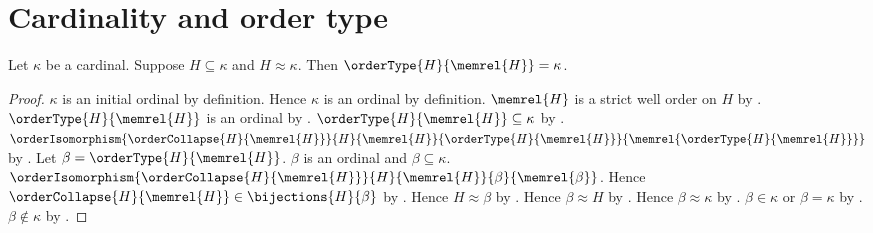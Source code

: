 \section{Cardinality and order type}











\begin{theorem}\label{full_cardinality_subset_order_type}
    Let $\kappa$ be a cardinal.
    Suppose $H\subseteq\kappa$ and $H\approx\kappa$.
    Then $\orderType{H}{\memrel{H}}=\kappa$.
\end{theorem}
\begin{proof}
    $\kappa$ is an initial ordinal by definition.
    Hence $\kappa$ is an ordinal by definition.
    $\memrel{H}$ is a strict well order on $H$ by
        .
    $\orderType{H}{\memrel{H}}$ is an ordinal by
        .
    $\orderType{H}{\memrel{H}}\subseteq\kappa$ by
        .
    $\orderIsomorphism{\orderCollapse{H}{\memrel{H}}}
        {H}{\memrel{H}}
        {\orderType{H}{\memrel{H}}}
        {\memrel{\orderType{H}{\memrel{H}}}}$ by
        .
    Let $\beta=\orderType{H}{\memrel{H}}$.
    $\beta$ is an ordinal and $\beta\subseteq\kappa$.
    $\orderIsomorphism{\orderCollapse{H}{\memrel{H}}}
        {H}{\memrel{H}}{\beta}{\memrel{\beta}}$.
    Hence $\orderCollapse{H}{\memrel{H}}\in\bijections{H}{\beta}$ by
        .
    Hence $H\approx\beta$ by .
    Hence $\beta\approx H$ by .
    Hence $\beta\approx\kappa$ by .
    $\beta\in\kappa$ or $\beta=\kappa$ by
        .
    $\beta\notin\kappa$ by .
\end{proof}

